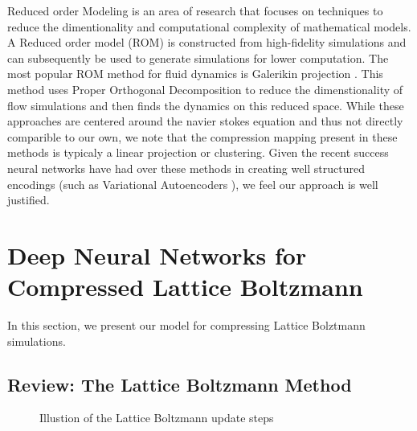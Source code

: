 \documentclass{article}
\begin{document}
Reduced order Modeling is an area of research that focuses on techniques to reduce the dimentionality and computational complexity of mathematical models. A Reduced order model (ROM) is constructed from high-fidelity simulations and can subsequently be used to generate simulations for lower computation. The most popular ROM method for fluid dynamics is Galerikin projection \cite{barone2009reduced}. This method uses Proper Orthogonal Decomposition to reduce the dimenstionality of flow simulations and then finds the dynamics on this reduced space.  
While these approaches are centered around the navier stokes equation and thus not directly comparible to our own, we note that the compression mapping present in these methods is typicaly a linear projection or clustering. Given the recent success neural networks have had over these methods in creating well structured encodings (such as Variational Autoencoders \cite{kingma2013auto} \cite{watter2015embed}), we feel our approach is well justified.

\section{Deep Neural Networks for Compressed Lattice Boltzmann}

In this section, we present our model for compressing Lattice Bolztmann simulations.

\subsection{Review: The Lattice Boltzmann Method}

\begin{figure}[!t]
\centering
{}
\caption{Illustion of the Lattice Boltzmann update steps}
\label{lattice_boltzmann}
\end{figure}
\end{document}
